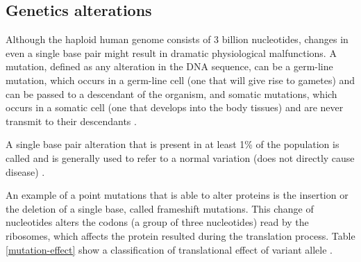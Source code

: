 
\subsection{Genetics alterations}

Although the haploid human genome consists of 3 billion nucleotides,
changes in even a single base pair might result in dramatic physiological malfunctions.
A mutation, defined as any alteration in the DNA sequence,
can be a  germ-line mutation, which occurs in a germ-line cell
(one that will give rise to gametes) and
can be passed to a descendant of the organism, and somatic mutations,
which occurs in a somatic cell (one that develops into the body tissues) and
are never transmit to their descendants \cite{clancy2008genetic}.


 A single base pair alteration that is present in at least 1\% of the population
is called   and is generally used to refer to a
normal variation (does not directly cause disease) \cite{clancy2008genetic}.

An example of a point mutations that is able to alter proteins is the insertion or the deletion of a single base, called frameshift mutations. This change of nucleotides alters the codons (a group of three nucleotides) read by the ribosomes, which
 affects the protein resulted during the translation process. Table \ref{mutation-effect}
 show a classification of translational effect of variant allele \cite{GTAK_maf,maf}.

